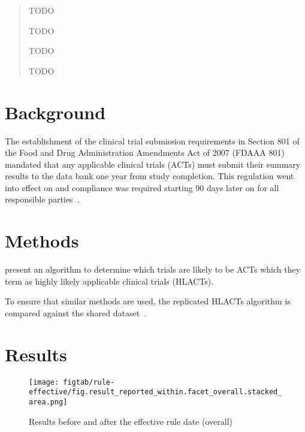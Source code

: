 \documentclass[10pt]{article}
\begin{document}
\maketitle

\begin{abstract}
\noindent
\begin{abstractdesc}
\item[Background] TODO
%
\item[Methods] TODO
%
\item[Results] TODO
%
\item[Conclusions] TODO
\end{abstractdesc}
\end{abstract}

\tableofcontents


\section{Background}

The establishment of the clinical trial submission requirements in
Section 801 of the Food and Drug Administration Amendments Act of 2007
(FDAAA 801)~\cite{publiclaw_fdaa_2007_s801}
mandated that any applicable clinical trials (ACTs) must
submit their summary results to the \ctgov{} data bank one year from study completion.
This regulation went into effect on 
and compliance was required starting 90 days later on
 for all responsible
parties~\cite{ctgov_fdaaa801_final_rule_2024,zarin_trial_2016}.

\section{Methods}

\textcite{anderson_compliance_2015} present an algorithm to
determine which trials are likely to be ACTs which they term as
highly likely applicable clinical trials (HLACTs).

To ensure that similar methods are used, the replicated HLACTs
algorithm is compared against the \textcite{anderson_compliance_2015}
shared dataset~\cite{anderson_data_20130927}.

\section{Results}


\begin{figure}
	\texttt{[image: figtab/rule-effective/fig.result\_reported\_within.facet\_overall.stacked\_area.png]}
	\label{fig:results-reported-rule-effective-overall}
	\caption{Results before and after the effective rule date (overall)}
\end{figure}
\end{document}
